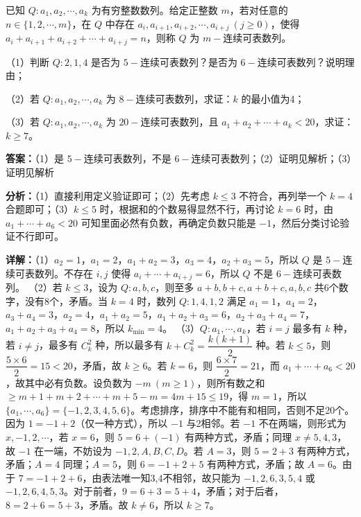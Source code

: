 \begin{question}[points=15]
已知 $Q: a_1, a_2, \cdots, a_k$ 为有穷整数数列。给定正整数 $m$，若对任意的 $n\in\{1,2,\cdots,m\}$，在 $Q$ 中存在 $a_i, a_{i+1}, a_{i+2}, \cdots, a_{i+j}\ (j\geq 0)$，使得 $a_i+a_{i+1}+a_{i+2}+\cdots+a_{i+j}=n$，则称 $Q$ 为 $m-$连续可表数列。

（1）判断 $Q:2,1,4$ 是否为 $5-$连续可表数列？是否为 $6-$连续可表数列？说明理由；

（2）若 $Q: a_1, a_2, \cdots, a_k$ 为 $8-$连续可表数列，求证：$k$ 的最小值为4；

（3）若 $Q: a_1, a_2, \cdots, a_k$ 为 $20-$连续可表数列，且 $a_1+a_2+\cdots+a_k<20$，求证：$k\geq 7$。
\begin{solution}
\textbf{答案：}（1）是 $5-$连续可表数列，不是 $6-$连续可表数列；（2）证明见解析；（3）证明见解析

\textbf{分析：}（1）直接利用定义验证即可；（2）先考虑 $k\leq 3$ 不符合，再列举一个 $k=4$ 合题即可；（3）$k\leq 5$ 时，根据和的个数易得显然不行，再讨论 $k=6$ 时，由 $a_1+\cdots+a_6<20$ 可知里面必然有负数，再确定负数只能是 $-1$，然后分类讨论验证不行即可。

\textbf{详解：}（1）$a_2=1$，$a_1=2$，$a_1+a_2=3$，$a_3=4$，$a_2+a_3=5$，所以 $Q$ 是 $5-$连续可表数列。不存在 $i,j$ 使得 $a_i+\cdots+a_{i+j}=6$，所以 $Q$ 不是 $6-$连续可表数列。
（2）若 $k\leq 3$，设为 $Q:a,b,c$，则至多 $a+b,b+c,a+b+c,a,b,c$ 共6个数字，没有8个，矛盾。当 $k=4$ 时，数列 $Q:1,4,1,2$ 满足 $a_1=1$，$a_4=2$，$a_3+a_4=3$，$a_2=4$，$a_1+a_2=5$，$a_1+a_2+a_3=6$，$a_2+a_3+a_4=7$，$a_1+a_2+a_3+a_4=8$，所以 $k_{\min}=4$。
（3）$Q: a_1,\cdots,a_k$，若 $i=j$ 最多有 $k$ 种，若 $i\neq j$，最多有 $C_k^2$ 种，所以最多有 $k+C_k^2 = \dfrac{k(k+1)}{2}$ 种。若 $k\leq 5$，则 $\dfrac{5\times6}{2}=15<20$，矛盾，故 $k\geq 6$。若 $k=6$，则 $\dfrac{6\times7}{2}=21$，而 $a_1+\cdots+a_6<20$，故其中必有负数。设负数为 $-m\ (m\geq 1)$，则所有数之和 $\geq m+1 + m+2 + \cdots + m+5 - m = 4m+15 \leq 19$，得 $m=1$，所以 $\{a_1,\cdots,a_6\}=\{-1,2,3,4,5,6\}$。考虑排序，排序中不能有和相同，否则不足20个。因为 $1=-1+2$（仅一种方式），所以 $-1$ 与2相邻。若 $-1$ 不在两端，则形式为 $x,-1,2,\cdots$，若 $x=6$，则 $5=6+(-1)$ 有两种方式，矛盾；同理 $x\neq 5,4,3$，故 $-1$ 在一端，不妨设为 $-1,2,A,B,C,D$。若 $A=3$，则 $5=2+3$ 有两种方式，矛盾；$A=4$ 同理；$A=5$，则 $6=-1+2+5$ 有两种方式，矛盾；故 $A=6$。由于 $7=-1+2+6$，由表法唯一知3,4不相邻，故只能为 $-1,2,6,3,5,4$ 或 $-1,2,6,4,5,3$。对于前者，$9=6+3=5+4$，矛盾；对于后者，$8=2+6=5+3$，矛盾。故 $k\neq 6$，所以 $k\geq 7$。
\end{solution}
\end{question}

